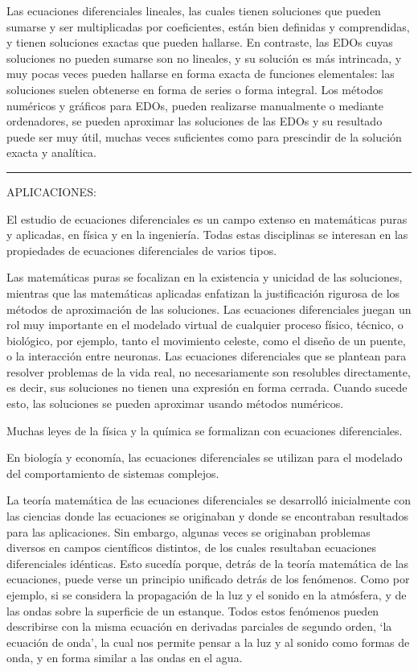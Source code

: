 Las ecuaciones diferenciales lineales, las cuales tienen soluciones que pueden sumarse y ser multiplicadas por coeficientes, están bien definidas y comprendidas, y tienen soluciones exactas que pueden hallarse. En contraste, las EDOs cuyas soluciones no pueden sumarse son no lineales, y su solución es más intrincada, y muy pocas veces pueden hallarse en forma exacta de funciones elementales: las soluciones suelen obtenerse en forma de series o forma integral. Los métodos numéricos y gráficos para EDOs, pueden realizarse manualmente o mediante ordenadores, se pueden aproximar las soluciones de las EDOs y su resultado puede ser muy útil, muchas veces suficientes como para prescindir de la solución exacta y analítica.


\vspace{7mm}

\vspace{1cm}
\color{ForestGreen!80}
\rule{250pt}{0.2pt}

APLICACIONES:

\vspace{3mm}

\normalsize{El} estudio de ecuaciones diferenciales es un campo extenso en matemáticas puras y aplicadas, en física y en la ingeniería. Todas estas disciplinas se interesan en las propiedades de ecuaciones diferenciales de varios tipos. 

Las matemáticas puras se focalizan en la existencia y unicidad de las soluciones, mientras que las matemáticas aplicadas enfatizan la justificación rigurosa de los métodos de aproximación de las soluciones. Las ecuaciones diferenciales juegan un rol muy importante en el modelado virtual de cualquier proceso físico, técnico, o biológico, por ejemplo, tanto el movimiento celeste, como el diseño de un puente, o la interacción entre neuronas. Las ecuaciones diferenciales que se plantean para resolver problemas de la vida real, no necesariamente son resolubles directamente, es decir, sus soluciones no tienen una expresión en forma cerrada. Cuando sucede esto, las soluciones se pueden aproximar usando métodos numéricos.

Muchas leyes de la física y la química se formalizan con ecuaciones diferenciales. 

En biología y economía, las ecuaciones diferenciales se utilizan para el modelado del comportamiento de sistemas complejos. 

La teoría matemática de las ecuaciones diferenciales se desarrolló inicialmente con las ciencias donde las ecuaciones se originaban y donde se encontraban resultados para las aplicaciones. Sin embargo, algunas veces se originaban problemas diversos en campos científicos distintos, de los cuales resultaban ecuaciones diferenciales idénticas. Esto sucedía porque, detrás de la teoría matemática de las ecuaciones, puede verse un principio unificado detrás de los fenómenos. Como por ejemplo, si se considera la propagación de la luz y el sonido en la atmósfera, y de las ondas sobre la superficie de un estanque. Todos estos fenómenos pueden describirse con la misma ecuación en derivadas parciales de segundo orden, `la ecuación de onda', la cual nos permite pensar a la luz y al sonido como formas de onda, y en forma similar a las ondas en el agua. 

